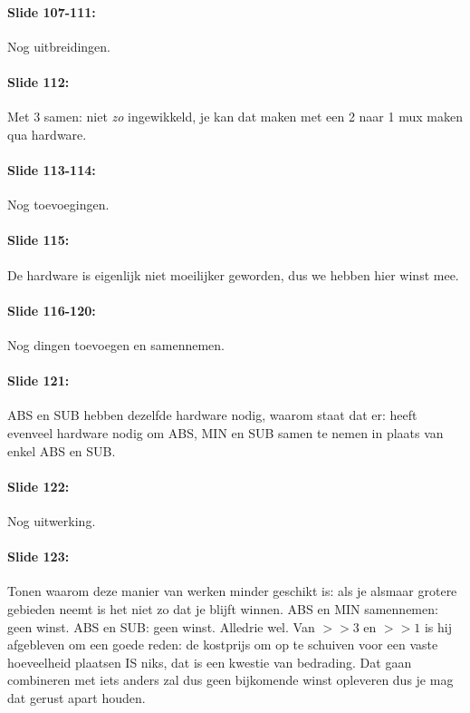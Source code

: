 \documentclass[10pt,a4paper]{book}
\begin{document}
\paragraph{Slide 107-111:} Nog uitbreidingen.

\paragraph{Slide 112:} Met 3 samen: niet \emph{zo} ingewikkeld, je kan dat maken met een 2 naar 1 mux maken qua hardware.

\paragraph{Slide 113-114:} Nog toevoegingen.

\paragraph{Slide 115:} De hardware is eigenlijk niet moeilijker geworden, dus we hebben hier winst mee.

\paragraph{Slide 116-120:} Nog dingen toevoegen en samennemen.

\paragraph{Slide 121:} ABS en SUB hebben dezelfde hardware nodig, waarom staat dat er: heeft evenveel hardware nodig om ABS, MIN en SUB samen te nemen in plaats van enkel ABS en SUB.

\paragraph{Slide 122:} Nog uitwerking.

\paragraph{Slide 123:} Tonen waarom deze manier van werken minder geschikt is: als je alsmaar grotere gebieden neemt is het niet zo dat je blijft winnen. ABS en MIN samennemen: geen winst. ABS en SUB: geen winst. Alledrie wel. Van $>>3$ en $>>1$ is hij afgebleven om een goede reden: de kostprijs om op te schuiven voor een vaste hoeveelheid plaatsen IS niks, dat is een kwestie van bedrading. Dat gaan combineren met iets anders zal dus geen bijkomende winst opleveren dus je mag dat gerust apart houden.
\end{document}
